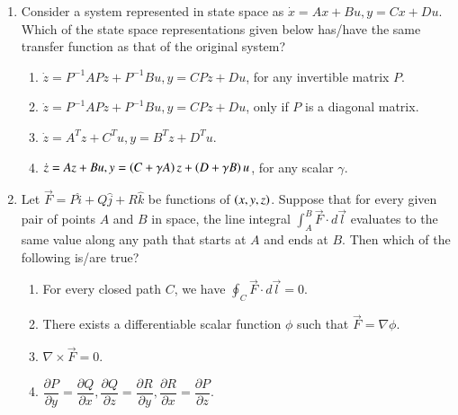 \documentclass[journal,12pt,onecolumn]{IEEEtran}
\theoremstyle{remark}
\begin{document}
\begin{enumerate}
\item Consider a system represented in state space as $\dot{x} = Ax + Bu, y = Cx + Du$. Which of the state space representations given below has/have the same transfer function as that of the original system?

\hfill{}
\begin{enumerate}
    \item $\dot{z} = P^{-1}APz + P^{-1}Bu, y = CPz + Du$, for any invertible matrix $P$.
    \item $\dot{z} = P^{-1}APz + P^{-1}Bu, y = CPz + Du$, only if $P$ is a diagonal matrix.
    \item $\dot{z} = A^T z + C^T u, y = B^T z + D^T u$.
    \item $\dot{z} = A z + Bu, y = \left(C+\gamma A\right)z + \left(D+\gamma B\right)u$, for any scalar $\gamma$.
\end{enumerate}

\item Let $\vec{F} = P\hat{i} + Q\hat{j} + R\hat{k}$ be functions of $\left(x,y,z\right)$. Suppose that for every given pair of points $A$ and $B$ in space, the line integral $\int_A^B \vec{F} \cdot d\vec{l}$ evaluates to the same value along any path that starts at $A$ and ends at $B$. Then which of the following is/are true?

\hfill{}
\begin{enumerate}
    \item For every closed path $C$, we have $\oint_C \vec{F} \cdot d\vec{l} = 0$.
    \item There exists a differentiable scalar function $\phi$ such that $\vec{F} = \nabla \phi$.
    \item $\nabla \times \vec{F} = 0$.
    \item $\dfrac{\partial P}{\partial y} = \dfrac{\partial Q}{\partial x}, \dfrac{\partial Q}{\partial z} = \dfrac{\partial R}{\partial y}, \dfrac{\partial R}{\partial x} = \dfrac{\partial P}{\partial z}$.
\end{enumerate}


\end{enumerate}
\end{document}
